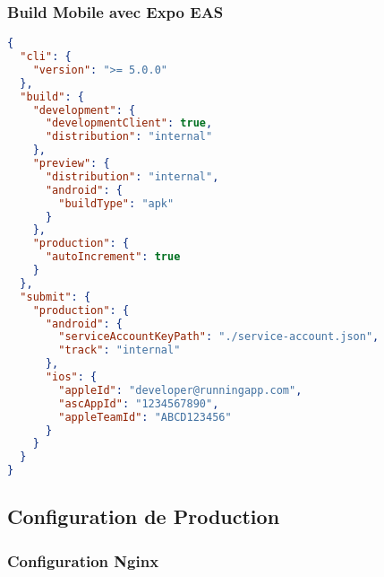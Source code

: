 \subsubsection{Build Mobile avec Expo EAS}

\begin{lstlisting}[language=json]
{
  "cli": {
    "version": ">= 5.0.0"
  },
  "build": {
    "development": {
      "developmentClient": true,
      "distribution": "internal"
    },
    "preview": {
      "distribution": "internal",
      "android": {
        "buildType": "apk"
      }
    },
    "production": {
      "autoIncrement": true
    }
  },
  "submit": {
    "production": {
      "android": {
        "serviceAccountKeyPath": "./service-account.json",
        "track": "internal"
      },
      "ios": {
        "appleId": "developer@runningapp.com",
        "ascAppId": "1234567890",
        "appleTeamId": "ABCD123456"
      }
    }
  }
}
\end{lstlisting}

\subsection{Configuration de Production}

\subsubsection{Configuration Nginx}

